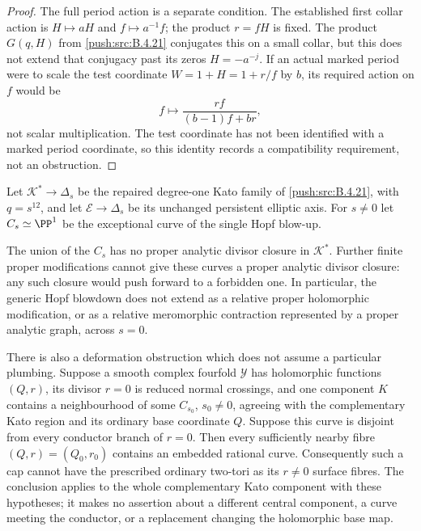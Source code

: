 \begin{proof}
The full period action is a separate condition. The established
first collar action is $H\mapsto aH$ and $f\mapsto a^{-1}f$;
the product $r=fH$ is fixed. The product $G(q,H)$ from \ref{push:src:B.4.21}
conjugates this on a small collar, but this does not extend that
conjugacy past its zeros $H=-a^{-j}$. If an actual marked period
were to scale the test coordinate $W=1+H=1+r/f$ by $b$, its
required action on $f$ would be
\[
 f\longmapsto\frac{rf}{(b-1)f+br},
\]
not scalar multiplication. The test coordinate has not been
identified with a marked period coordinate, so this identity
records a compatibility requirement, not an obstruction.
\end{proof}

\begin{proposition}\label{push:src:B.4.23}
Let $\mathcal K^*\to\Delta_s$ be the repaired degree-one
Kato family of \ref{push:src:B.4.21}, with $q=s^{12}$, and let
$\mathcal E\to\Delta_s$ be its unchanged persistent elliptic
axis. For $s\ne0$ let $C_s\simeq\PP^1$ be the exceptional
curve of the single Hopf blow-up.

The union of the $C_s$ has no proper analytic divisor
closure in $\mathcal K^*$. Further finite proper modifications
cannot give these curves a proper analytic divisor closure:
any such closure would push forward to a forbidden one.
In particular, the generic Hopf blowdown does not extend
as a relative proper holomorphic modification, or as a
relative meromorphic contraction represented by a proper
analytic graph, across $s=0$.

There is also a deformation obstruction which does not
assume a particular plumbing. Suppose a smooth complex
fourfold $\mathcal Y$ has holomorphic functions $(Q,r)$,
its divisor $r=0$ is reduced normal crossings, and one
component $K$ contains a neighbourhood of some $C_{s_0}$,
$s_0\ne0$, agreeing with the complementary Kato region
and its ordinary base coordinate $Q$. Suppose this curve
is disjoint from every conductor branch of $r=0$.
Then every sufficiently nearby fibre $(Q,r)=(Q_0,r_0)$
contains an embedded rational curve. Consequently such a
cap cannot have the prescribed ordinary two-tori as its
$r\ne0$ surface fibres. The conclusion applies to the
whole complementary Kato component with these hypotheses;
it makes no assertion about a different central component,
a curve meeting the conductor, or a replacement changing
the holomorphic base map.
\end{proposition}

